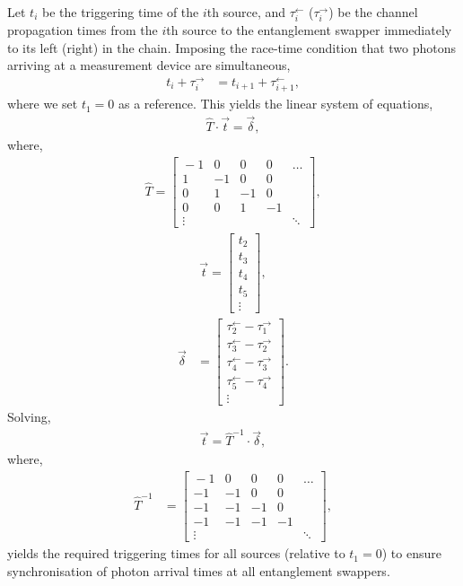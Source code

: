 Let $t_i$ be the triggering time of the $i$th source, and $\tau_i^\leftarrow$ ($\tau_i^\rightarrow$) be the channel propagation times from the $i$th source to the entanglement swapper immediately to its left (right) in the chain. Imposing the race-time condition that two photons arriving at a measurement device are simultaneous,
\begin{align}\label{eq:ent_sync_cond}
t_i + \tau_i^\rightarrow &= t_{i+1} + \tau_{i+1}^\leftarrow,	
\end{align}
where we set \mbox{$t_1=0$} as a reference. This yields the linear system of equations,
\begin{align}
\hat{T}\cdot\vec{t} = \vec{\delta},
\end{align}
where,
\begin{align}
\hat{T} = \left[\begin{matrix}{}
 -1 & 0 & 0 & 0 &\dots \\
 1 & -1 & 0 & 0 & \\
 0 & 1 & -1 & 0 & \\
 0 & 0 & 1 & -1 & \\
 \vdots & & & & \ddots
\end{matrix}\right],
\end{align}
\begin{align}
\vec{t} = \left[\begin{matrix}{}
t_2\\
t_3\\
t_4\\
t_5\\
\vdots	
\end{matrix}\right],
\end{align}
\begin{align}
\vec\delta &= \left[\begin{matrix}{}
\tau_{2}^\leftarrow - \tau_1^\rightarrow	 \\
\tau_{3}^\leftarrow - \tau_2^\rightarrow	 \\
\tau_{4}^\leftarrow - \tau_3^\rightarrow	 \\
\tau_{5}^\leftarrow - \tau_4^\rightarrow	 \\
\vdots
\end{matrix}\right].
\end{align}
Solving,
\begin{align}\label{eq:repeater_trig_time_sol}
	\vec{t} = \hat{T}^{-1}\cdot\vec\delta,
\end{align}
where,
\begin{align}
	\hat{T}^{-1} & = \left[\begin{matrix}{}
 -1 & 0 & 0 & 0 &\dots \\
 -1 & -1 & 0 & 0 & \\
 -1 & -1 & -1 & 0 & \\
 -1 & -1 & -1 & -1 & \\
 \vdots & & & & \ddots
\end{matrix}\right],
\end{align}
yields the required triggering times for all sources (relative to \mbox{$t_1=0$}) to ensure synchronisation of photon arrival times at all entanglement swappers.